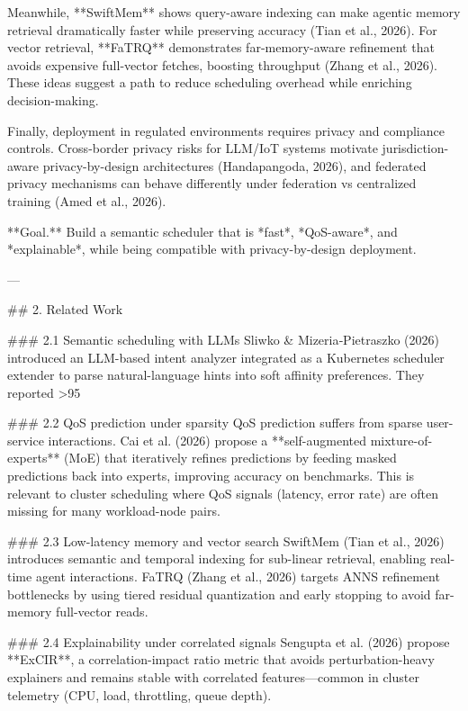 Meanwhile, **SwiftMem** shows query-aware indexing can make agentic memory retrieval dramatically faster while preserving accuracy (Tian et al., 2026). For vector retrieval, **FaTRQ** demonstrates far-memory-aware refinement that avoids expensive full-vector fetches, boosting throughput (Zhang et al., 2026). These ideas suggest a path to reduce scheduling overhead while enriching decision-making.

Finally, deployment in regulated environments requires privacy and compliance controls. Cross-border privacy risks for LLM/IoT systems motivate jurisdiction-aware privacy-by-design architectures (Handapangoda, 2026), and federated privacy mechanisms can behave differently under federation vs centralized training (Amed et al., 2026).

**Goal.** Build a semantic scheduler that is *fast*, *QoS-aware*, and *explainable*, while being compatible with privacy-by-design deployment.

---

## 2. Related Work

### 2.1 Semantic scheduling with LLMs
Sliwko & Mizeria‑Pietraszko (2026) introduced an LLM-based intent analyzer integrated as a Kubernetes scheduler extender to parse natural-language hints into soft affinity preferences. They reported >95%

### 2.2 QoS prediction under sparsity
QoS prediction suffers from sparse user-service interactions. Cai et al. (2026) propose a **self-augmented mixture-of-experts** (MoE) that iteratively refines predictions by feeding masked predictions back into experts, improving accuracy on benchmarks. This is relevant to cluster scheduling where QoS signals (latency, error rate) are often missing for many workload-node pairs.

### 2.3 Low-latency memory and vector search
SwiftMem (Tian et al., 2026) introduces semantic and temporal indexing for sub-linear retrieval, enabling real-time agent interactions. FaTRQ (Zhang et al., 2026) targets ANNS refinement bottlenecks by using tiered residual quantization and early stopping to avoid far-memory full-vector reads.

### 2.4 Explainability under correlated signals
Sengupta et al. (2026) propose **ExCIR**, a correlation-impact ratio metric that avoids perturbation-heavy explainers and remains stable with correlated features—common in cluster telemetry (CPU, load, throttling, queue depth).

